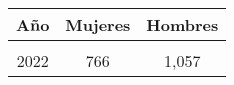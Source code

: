 \begin{tabular}[t]{ccc}
\toprule
\textbf{Año} & \textbf{Mujeres} & \textbf{Hombres}\\
\midrule
\cellcolor[HTML]{B6B3FF}{2018} & \cellcolor[HTML]{B6B3FF}{1,000} & \cellcolor[HTML]{B6B3FF}{1,288}\\
2022 & 766 & 1,057\\
\bottomrule
\end{tabular}
